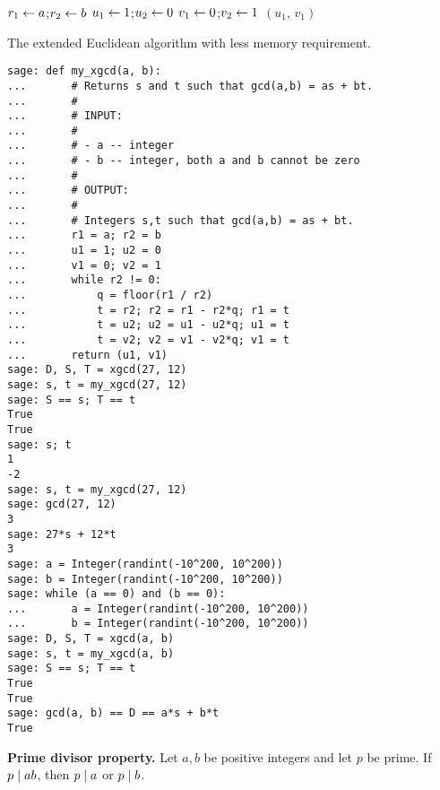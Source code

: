 \begin{algorithm}[!htbp]
\dontprintsemicolon
\BlankLine
$r_1 \leftarrow a$;\quad $r_2 \leftarrow b$\;
$u_1 \leftarrow 1$;\quad $u_2 \leftarrow 0$\;
$v_1 \leftarrow 0$;\quad $v_2 \leftarrow 1$\;
\Return $(u_1,\, v_1)$
\caption{The extended Euclidean algorithm with less memory
  requirement.}
\label{alg:unique_factorization:extended_GCD_memory_efficient}
\end{algorithm}

\begin{lstlisting}
sage: def my_xgcd(a, b):
...       # Returns s and t such that gcd(a,b) = as + bt.
...       #
...       # INPUT:
...       #
...       # - a -- integer
...       # - b -- integer, both a and b cannot be zero
...       #
...       # OUTPUT:
...       #
...       # Integers s,t such that gcd(a,b) = as + bt.
...       r1 = a; r2 = b
...       u1 = 1; u2 = 0
...       v1 = 0; v2 = 1
...       while r2 != 0:
...           q = floor(r1 / r2)
...           t = r2; r2 = r1 - r2*q; r1 = t
...           t = u2; u2 = u1 - u2*q; u1 = t
...           t = v2; v2 = v1 - v2*q; v1 = t
...       return (u1, v1)
sage: D, S, T = xgcd(27, 12)
sage: s, t = my_xgcd(27, 12)
sage: S == s; T == t
True
True
sage: s; t
1
-2
sage: s, t = my_xgcd(27, 12)
sage: gcd(27, 12)
3
sage: 27*s + 12*t
3
sage: a = Integer(randint(-10^200, 10^200))
sage: b = Integer(randint(-10^200, 10^200))
sage: while (a == 0) and (b == 0):
...       a = Integer(randint(-10^200, 10^200))
...       b = Integer(randint(-10^200, 10^200))
sage: D, S, T = xgcd(a, b)
sage: s, t = my_xgcd(a, b)
sage: S == s; T == t
True
True
sage: gcd(a, b) == D == a*s + b*t
True
\end{lstlisting}

\begin{corollary}
\label{cor:unique_factorization:prime_divisor_property}
\textbf{Prime divisor property.}
Let $a,b$ be positive integers and let $p$ be prime. If $p \;|\; ab$,
then $p \;|\; a$ or $p \;|\; b$.
\end{corollary}

